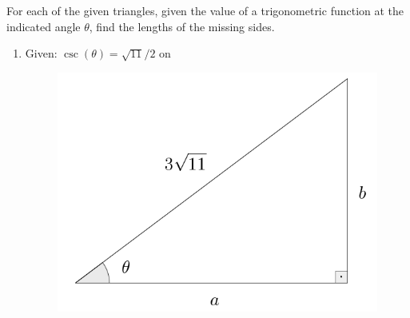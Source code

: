 \documentclass{ximera}
\begin{document}
\begin{example}
  For each of the given triangles, given the value of a trigonometric function at the indicated angle $\theta$, find the lengths of the missing sides.
  \begin{enumerate}[label=\alph*.]
  \item Given: $\csc(\theta) = \sqrt{11}/2$ on
    \begin{figure}[h]
      \centering
      \includegraphics[scale=.3]{./figures/9-1-2-triangle-3sqrt11.png}
    \end{figure}
    

\end{enumerate}
\end{example}
\end{document}

